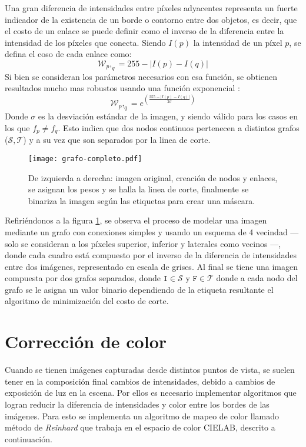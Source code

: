 Una gran diferencia de intensidades entre píxeles adyacentes representa un fuerte indicador de la existencia de un borde o contorno entre dos objetos, es decir, que el costo de un enlace se puede definir como el inverso de la diferencia entre la intensidad de los píxeles que conecta. Siendo $I(p)$ la intensidad de un píxel $p$, se defina el coso de cada enlace como:
\begin{equation}
\mathcal{W}_p,_q = 255 - |I(p) - I (q)|
\label{costo-corte}
\end{equation}
Si bien se consideran los parámetros necesarios con esa función, se obtienen resultados mucho mas robustos usando una función exponencial \cite{graph-opencv}:
\begin{equation}
\mathcal{W}_p,_q = e^{\left(\frac{255-|I(p) - I (q)|}{2 \sigma}  \right) }
\label{costo-corte}
\end{equation}
Donde $\sigma$ es la desviación estándar de la imagen, y siendo válido para los casos en los que $f_p \neq f_q$. Esto indica que dos nodos continuos pertenecen a distintos grafos ($\mathcal{S,T}$) y a su vez que son separados por la linea de corte.

\begin{figure}[h]
	\centering
	\texttt{[image: grafo-completo.pdf]}
	\caption[Corte por grafo]{De izquierda a derecha: imagen original, creación de nodos y enlaces, se asignan los pesos y se halla la linea de corte, finalmente se binariza la imagen según las etiquetas para crear una máscara.}
	\label{imagen:grafo}
\end{figure}

Refiriéndonos a la figura \ref{imagen:grafo}, se observa el proceso de modelar una imagen mediante un grafo con conexiones simples y usando un esquema de 4 vecindad --- solo se consideran a los píxeles superior, inferior y laterales como vecinos ---, donde cada cuadro está compuesto por el inverso de la diferencia de intensidades entre dos imágenes, representado en escala de grises. Al final se tiene una imagen compuesta por dos grafos separados, donde $\mathtt{I} \in \mathcal{S}$ y $\mathtt{F} \in \mathcal{T}$ donde a cada nodo del grafo se le asigna un valor binario dependiendo de la etiqueta resultante el algoritmo de minimización del costo de corte.


\section{Corrección de color}\label{seccion-color}
Cuando se tienen imágenes capturadas desde distintos puntos de vista, se suelen tener en la composición final cambios de intensidades, debido a cambios de exposición de luz en la escena. Por ellos es necesario implementar algoritmos que logran reducir la diferencia de intensidades y color entre los bordes de las imágenes. Para esto se implementa un algoritmo de mapeo de color llamado método de \textit{Reinhard} \cite{reinhard} que trabaja en el espacio de color CIELAB, descrito a continuación. 


